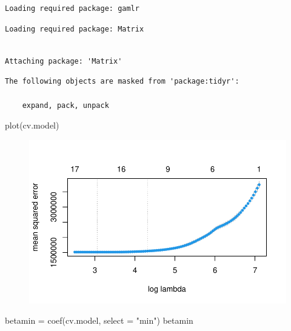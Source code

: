 \documentclass[
  letterpaper,
  DIV=11,
  numbers=noendperiod]{scrartcl}
\newenvironment{Shaded}{\begin{snugshade}}{\end{snugshade}}
\newcommand{\AttributeTok}[1]{\textcolor[rgb]{0.40,0.45,0.13}{#1}}
\newcommand{\FunctionTok}[1]{\textcolor[rgb]{0.28,0.35,0.67}{#1}}
\newcommand{\NormalTok}[1]{\textcolor[rgb]{0.00,0.23,0.31}{#1}}
\newcommand{\OtherTok}[1]{\textcolor[rgb]{0.00,0.23,0.31}{#1}}
\newcommand{\StringTok}[1]{\textcolor[rgb]{0.13,0.47,0.30}{#1}}
\begin{document}
\begin{verbatim}
Loading required package: gamlr
\end{verbatim}

\begin{verbatim}
Loading required package: Matrix
\end{verbatim}

\begin{verbatim}

Attaching package: 'Matrix'
\end{verbatim}

\begin{verbatim}
The following objects are masked from 'package:tidyr':

    expand, pack, unpack
\end{verbatim}

\begin{Shaded}
\begin{Highlighting}[]
\FunctionTok{plot}\NormalTok{(cv.model)}
\end{Highlighting}
\end{Shaded}

\begin{figure}[H]

{\centering \includegraphics{index_files/figure-pdf/unnamed-chunk-20-1.pdf}

}

\end{figure}

\begin{Shaded}
\begin{Highlighting}[]
\NormalTok{betamin }\OtherTok{=} \FunctionTok{coef}\NormalTok{(cv.model, }\AttributeTok{select =} \StringTok{"min"}\NormalTok{)}
\NormalTok{betamin}
\end{Highlighting}
\end{Shaded}
\end{document}
